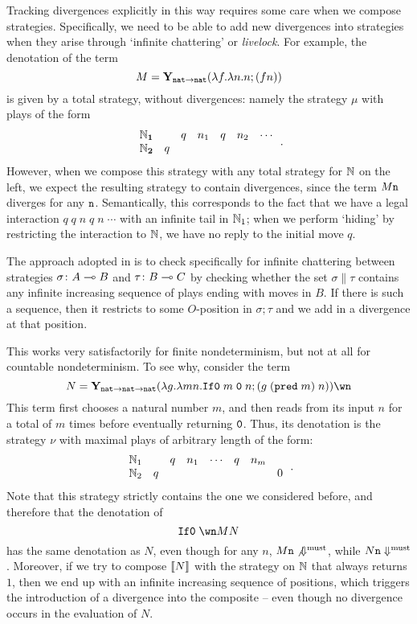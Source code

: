 \documentclass[sigplan,10pt,review]{acmart}\settopmatter{printfolios=true,printccs=false,printacmref=false}
\begin{document}
Tracking divergences explicitly in this way requires some care when we compose strategies.  
Specifically, we need to be able to add new divergences into strategies when they arise through `infinite chattering' or \emph{livelock}.  
For example, the denotation of the term
\[
  M = \mathbf{Y}_{{\mathtt{nat}}\to{\mathtt{nat}}}(\lambda f.\lambda n.n;(f n))
  \]
is given by a total strategy, without divergences: namely the strategy $\mu$ with plays of the form
\[
  \begin{array}{ccccccc}
    \mathbf{\mathbb{N}_1} &   & q & n_1 & q & n_2 & \cdots \\
    \mathbf{\mathbb{N}_2} & q &   &     &   &     &
  \end{array}\,.
  \]
However, when we compose this strategy with any total strategy for $\mathbb{N}$ on the left, we expect the resulting strategy to contain divergences, since the term $M {\mathtt{n}}$ diverges for any ${\mathtt{n}}$.
Semantically, this corresponds to the fact that we have a legal interaction $q\;q\;n\;q\;n\;\cdots$ with an infinite tail in $\mathbb{N}_1$; when we perform `hiding' by restricting the interaction to $\mathbb{N}$, we have no reply to the initial move $q$.

The approach adopted in \cite{mcCHFiniteND} is to check specifically for infinite chattering between strategies $\sigma\colon A\multimap B$ and $\tau\colon B\multimap C$ by checking whether the set $\sigma\|\tau$ contains any infinite increasing sequence of plays ending with moves in $B$.  
If there is such a sequence, then it restricts to some $O$-position in $\sigma;\tau$ and we add in a divergence at that position.  

This works very satisfactorily for finite nondeterminism, but not at all for countable nondeterminism.  
To see why, consider the term
\[
  N = \Y_{\nat\to\nat\to\nat}(\lambda g.\lambda m n.\IfO m\;\0\;n;(g\;(\pred m)\;n))\wn
  \]
This term first chooses a natural number $m$, and then reads from its input $n$ for a total of $m$ times before eventually returning ${\mathtt{0}}$.  
Thus, its denotation is the strategy $\nu$ with maximal plays of arbitrary length of the form:
\[
  \begin{array}{cccccccc}
    \mathbb{N}_1 &   & q & n_1 & \cdots & q & n_m & \\
    \mathbb{N}_2 & q &   &     &        &   &     & 0
  \end{array}\,.
  \]
Note that this strategy strictly contains the one we considered before, and therefore that the denotation of
\[
  \IfO \wn M N
  \]
has the same denotation as $N$, even though for any $n$, $M{\mathtt{n}}\not{\Downarrow^{\text{must}}}$, while $N{\mathtt{n}}\Downarrow^{\text{must}}$.
Moreover, if we try to compose $\left\llbracket N\right\rrbracket$ with the strategy on $\mathbb{N}$ that always returns $1$, then we end up with an infinite increasing sequence of positions, which triggers the introduction of a divergence into the composite -- even though no divergence occurs in the evaluation of $N$.
\end{document}
